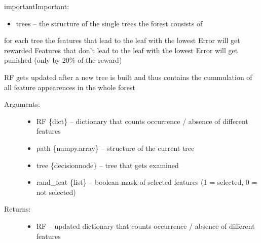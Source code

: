 \documentclass[letterpaper,10pt,english]{sphinxmanual}
\begin{document}
\begin{sphinxadmonition}{important}{Important:}
\begin{fulllineitems}
\begin{description}
\begin{itemize}
\item {} 
trees -- the structure of the single trees the forest consists of

\end{itemize}

\end{description}

\end{fulllineitems}

\label{\detokenize{RF:update-rf}}

\begin{fulllineitems}
\label{\detokenize{RF:ForestFire.Main.update_RF}}
for each tree the features that lead to the leaf with the lowest Error will get rewarded
Features that don't lead to the leaf with the lowest Error will get punished (only by 20\% of the reward)

RF gets updated after a new tree is built and thus contains the cummulation of all
feature appearences in the whole forest
\begin{description}
\item[{Arguments:}] \leavevmode\begin{itemize}
\item {} 
RF \{dict\} -- dictionary that counts occurrence / absence of different features

\item {} 
path \{numpy.array\} -- structure of the current tree

\item {} 
tree \{decisionnode\} -- tree that gets examined

\item {} 
rand\_feat \{list\} -- boolean mask of selected features (1 = selected, 0 = not selected)

\end{itemize}

\item[{Returns:}] \leavevmode\begin{itemize}
\item {} 
RF -- updated dictionary that counts occurrence / absence of different features

\end{itemize}

\end{description}


\end{fulllineitems}
\end{sphinxadmonition}
\end{document}
